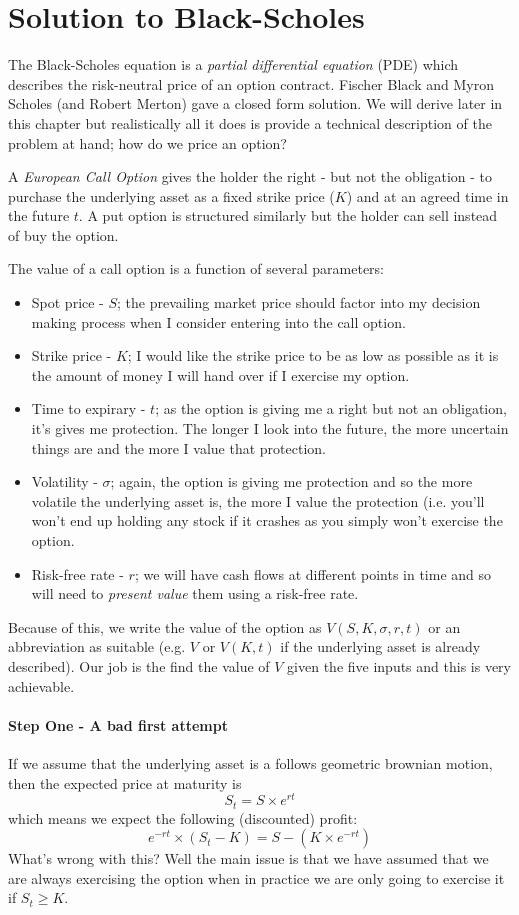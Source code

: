 \documentclass[../../Axiomathic.tex]{subfiles}
\begin{document}
\section{Solution to Black-Scholes}
The Black-Scholes equation is a \textit{partial differential equation} (PDE) which describes the risk-neutral price of an option contract. Fischer Black and Myron Scholes (and Robert Merton) gave a closed form solution. We will derive later in this chapter but realistically all it does is provide a technical description of the problem at hand; how do we price an option?
\begin{defn}
A \textit{European Call Option} gives the holder the right - but not the obligation - to purchase the underlying asset as a fixed strike price ($K$) and at an agreed time in the future $t$. A put option is structured similarly but the holder can sell instead of buy the option. 
\end{defn}
The value of a call option is a function of several parameters:
\begin{itemize}
\item{Spot price - $S$; the prevailing market price should factor into my decision making process when I consider entering into the call option.}
\item{Strike price - $K$; I would like the strike price to be as low as possible as it is the amount of money I will hand over if I exercise my option.}
\item{Time to expirary - $t$; as the option is giving me a right but not an obligation, it's gives me protection. The longer I look into the future, the more uncertain things are and the more I value that protection.}
\item{Volatility - $\sigma$; again, the option is giving me protection and so the more volatile the underlying asset is, the more I value the protection (i.e. you'll won't end up holding any stock if it crashes as you simply won't exercise the option.}
\item{Risk-free rate - $r$; we will have cash flows at different points in time and so will need to \textit{present value} them using a risk-free rate.}
\end{itemize}
Because of this, we write the value of the option as $V(S,K,\sigma,r,t)$ or an abbreviation as suitable (e.g. $V$ or $V(K,t)$ if the underlying asset is already described). 
Our job is the find the value of $V$ given the five inputs and this is very achievable. 
\paragraph{Step One - A bad first attempt}
If we assume that the underlying asset is a follows geometric brownian motion, then the expected price at maturity is \[S_t=S\times e^{rt} \] which means we expect the following (discounted) profit: \[e^{-rt} \times \left(  S_t-K \right) =S -\left (K\times e^{-rt} \right )\]
What's wrong with this? Well the main issue is that we have assumed that we are always exercising the option when in practice we are only going to exercise it if $S_t \geq K$. 
\end{document}
